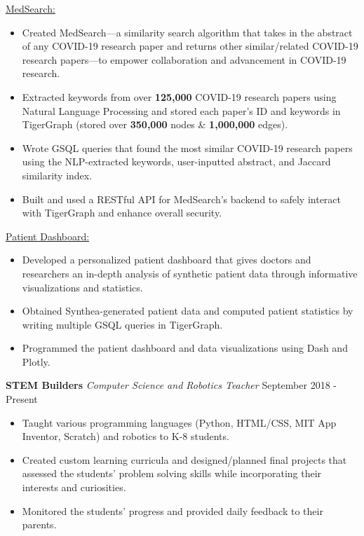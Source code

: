 \documentclass[11pt]{res}
\begin{document}
\begin{footnotesize}
\begin{resume}
\vspace{-4mm}
\underline{MedSearch:}
\vspace{-5.10mm}
\begin{itemize} \itemsep -2pt 
\item Created MedSearch—a similarity search algorithm that takes in the abstract of any COVID-19 research paper and returns other similar/related COVID-19 research papers—to empower collaboration and advancement in COVID-19 research. 
\vspace{.75mm}
\item Extracted keywords from over \textbf{125,000} COVID-19 research papers using Natural Language Processing and stored each paper's ID and keywords in TigerGraph (stored over \textbf{350,000} nodes \& \textbf{1,000,000} edges).
\vspace{.75mm}
\item Wrote GSQL queries that found the most similar COVID-19 research papers using the NLP-extracted keywords, user-inputted abstract, and Jaccard similarity index.
\vspace{.75mm}
\item Built and used a RESTful API for MedSearch's backend to safely interact with TigerGraph and enhance overall security.
\end{itemize}
\vspace{-4.75mm}
\underline{Patient Dashboard:}
\vspace{-5.10mm}
\begin{itemize} \itemsep -2pt 
\item Developed a personalized patient dashboard that gives doctors and researchers an in-depth analysis of synthetic patient data through informative visualizations and statistics. 
\vspace{.75mm}
\item Obtained Synthea-generated patient data and computed patient statistics by writing multiple GSQL queries in TigerGraph.
\vspace{-3mm}
\item Programmed the patient dashboard and data visualizations using Dash and Plotly.
\end{itemize}
\vspace{-2mm}
\textbf{STEM Builders} {\sl Computer Science and Robotics Teacher} \hfill September 2018 - Present\vspace{-5.25mm}
\begin{itemize} \itemsep -2pt 
\item Taught various programming languages (Python, HTML/CSS, MIT App Inventor, Scratch) and robotics to K-8 students. 
\vspace{.75mm}
\item Created custom learning curricula and designed/planned final projects that assessed the students' problem solving skills while incorporating their interests and curiosities. 
\vspace{.75mm}
\item Monitored the students' progress and provided daily feedback to their parents.
\end{itemize}

\end{resume}
\end{footnotesize}
\end{document}

